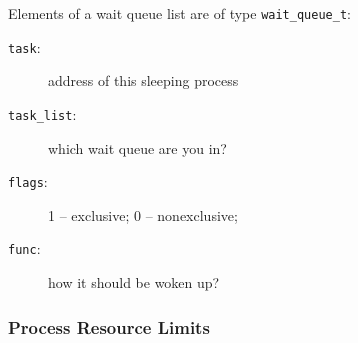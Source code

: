 \begin{frame}
  \begin{block}{Elements of a wait queue list are of type \texttt{wait\_queue\_t}:}
    \begin{center}
    \end{center}
    \begin{description}
    \item[\texttt{task}:] address of this sleeping process
    \item[\texttt{task\_list}:] which wait queue are you in?
    \item[\texttt{flags}:] 1 -- exclusive; 0 -- nonexclusive;
    \item[\texttt{func}:] how it should be woken up?
    \end{description}
  \end{block}
\end{frame}


\subsubsection{Process Resource Limits}

